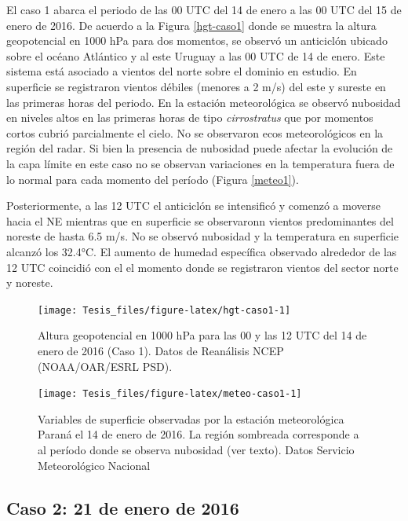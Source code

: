 \documentclass[12pt,spanish,oneside]{book}
\begin{document}
El caso 1 abarca el periodo de las 00 UTC del 14 de enero a las 00 UTC
del 15 de enero de 2016. De acuerdo a la Figura \ref{hgt-caso1} donde se
muestra la altura geopotencial en 1000 hPa para dos momentos, se observó
un anticiclón ubicado sobre el océano Atlántico y al este Uruguay a las
00 UTC de 14 de enero. Este sistema está asociado a vientos del norte
sobre el dominio en estudio. En superficie se registraron vientos
débiles (menores a 2 m/s) del este y sureste en las primeras horas del
periodo. En la estación meteorológica se observó nubosidad en niveles
altos en las primeras horas de tipo \emph{cirrostratus} que por momentos
cortos cubrió parcialmente el cielo. No se observaron ecos
meteorológicos en la región del radar. Si bien la presencia de nubosidad
puede afectar la evolución de la capa límite en este caso no se observan
variaciones en la temperatura fuera de lo normal para cada momento del
período (Figura \ref{meteo1}).

Posteriormente, a las 12 UTC el anticiclón se intensificó y comenzó a
moverse hacia el NE mientras que en superficie se observaronn vientos
predominantes del noreste de hasta 6.5 m/s. No se observó nubosidad y la
temperatura en superficie alcanzó los 32.4°C. El aumento de humedad
específica observado alrededor de las 12 UTC coincidió con el el momento
donde se registraron vientos del sector norte y noreste.

\begin{figure}

{\centering \texttt{[image: Tesis\_files/figure-latex/hgt-caso1-1]} 

}

\caption{Altura geopotencial en 1000 hPa para las 00 y las 12 UTC del 14 de enero de 2016 (Caso 1). Datos de Reanálisis NCEP (NOAA/OAR/ESRL PSD). \label{hgt-caso1}}\label{fig:hgt-caso1}
\end{figure}

\begin{figure}

{\centering \texttt{[image: Tesis\_files/figure-latex/meteo-caso1-1]} 

}

\caption{Variables de superficie observadas por la estación meteorológica Paraná el 14 de enero de 2016. La región sombreada corresponde a al período donde se observa nubosidad (ver texto). Datos Servicio Meteorológico Nacional \label{meteo1}}\label{fig:meteo-caso1}
\end{figure}

\subsection{Caso 2: 21 de enero de
2016}\label{caso-2-21-de-enero-de-2016}
\end{document}
